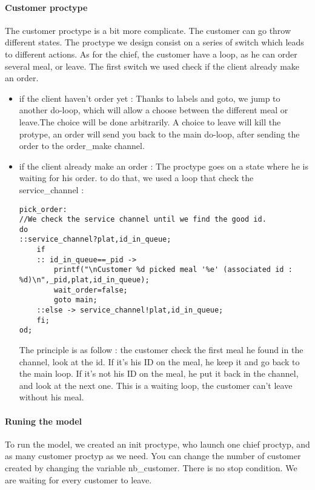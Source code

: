 \documentclass[a4paper,11pt]{article} %
\begin{document}
\paragraph{Customer proctype} The customer proctype is a bit more complicate. The customer can go throw different states. The proctype we design consist on a series of switch which leads to different actions. As for the chief, the customer have a loop, as he can order several meal, or leave.
The first switch we used check if the client already make an order.
\begin{itemize}
\item if the client haven't order yet : Thanks to labels and goto, we jump to another do-loop, which will allow a choose between the different meal or leave.The choice will be done arbitrarily. A choice to leave will kill the protype, an order will send you back to the main do-loop, after sending the order to the order\_make channel.
\item if the client already make an order : The proctype goes on a state where he is waiting for his order. to do that, we used a loop that check the service\_channel : 
\begin{lstlisting}
pick_order:
//We check the service channel until we find the good id.
do
::service_channel?plat,id_in_queue;
	if
	:: id_in_queue==_pid -> 
		printf("\nCustomer %d picked meal '%e' (associated id : %d)\n",_pid,plat,id_in_queue);
		wait_order=false;
		goto main;
	::else -> service_channel!plat,id_in_queue;
	fi;
od; 
\end{lstlisting}
The principle is as follow : the customer check the first meal he found in the channel, look at the id. If it's his ID on the meal, he keep it and go back to the main loop. If it's not his ID on the meal, he put it back in the channel, and look at the next one. This is a waiting loop, the customer can't leave without his meal.
\end{itemize} 
\paragraph{Runing the model}
To run the model, we created an init proctype, who launch one chief proctyp, and as many customer proctyp as we need. You can change the number of customer created by changing the variable nb\_customer. There is no stop condition. We are waiting for every customer to leave.
\end{document}
